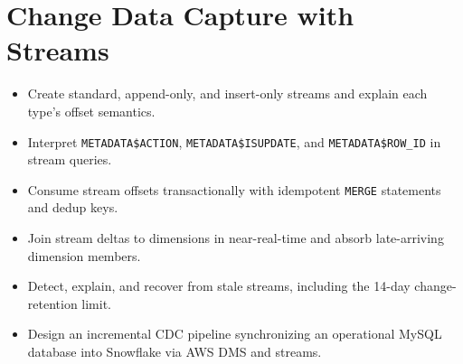 \chapter{Change Data Capture with Streams}
%
\begin{objectives}
\begin{itemize}
    \item Create standard, append-only, and insert-only streams and explain each type's offset semantics.
    \item Interpret \texttt{METADATA\$ACTION}, \texttt{METADATA\$ISUPDATE}, and \texttt{METADATA\$ROW\_ID} in stream queries.
    \item Consume stream offsets transactionally with idempotent \texttt{MERGE} statements and dedup keys.
    \item Join stream deltas to dimensions in near-real-time and absorb late-arriving dimension members.
    \item Detect, explain, and recover from stale streams, including the 14-day change-retention limit.
    \item Design an incremental CDC pipeline synchronizing an operational MySQL database into Snowflake via AWS DMS and streams.
\end{itemize}
\end{objectives}

